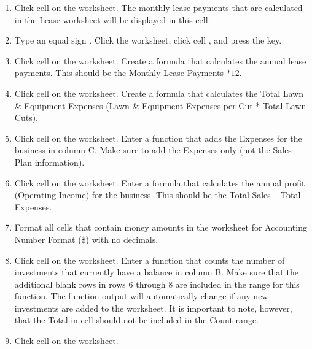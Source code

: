 \begin{enumerate}
	\item Click cell  on the  worksheet. The monthly lease payments that are calculated in the Lease worksheet will be displayed in this cell.
	
	\item Type an equal sign \fmtTyping{=}. Click the  worksheet, click cell , and press the  key.
	
	\item Click cell  on the  worksheet. Create a formula that calculates the annual lease payments. This should be the Monthly Lease Payments $ * 12 $.
	
	\item Click cell  on the  worksheet. Create a formula that calculates the Total Lawn \& Equipment Expenses (Lawn \& Equipment Expenses per Cut * Total Lawn Cuts).
	
	\item Click cell  on the  worksheet. Enter a  function that adds the Expenses for the business in column C. Make sure to add the Expenses only (not the Sales Plan information).
	
	\item Click cell  on the  worksheet. Enter a formula that calculates the annual profit (Operating Income) for the business. This should be the Total Sales $ – $ Total Expenses.
	
	\item Format all cells that contain money amounts in the  worksheet for Accounting Number Format (\$) with no decimals.
	
	\item Click cell  on the  worksheet. Enter a  function that counts the number of investments that currently have a balance in column B. Make sure that the additional blank rows in rows 6 through 8 are included in the range for this function. The function output will automatically change if any new investments are added to the worksheet. It is important to note, however, that the Total in cell  should not be included in the Count range.
	
	\item Click cell  on the  worksheet.
	

\end{enumerate}

